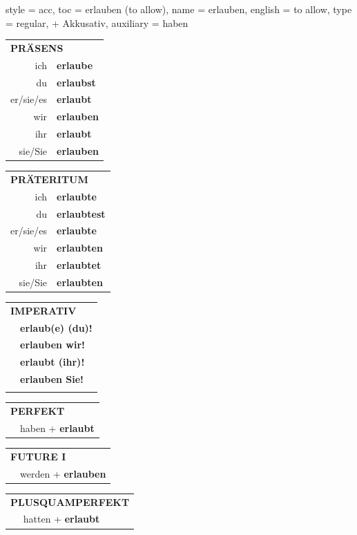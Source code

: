 \begin{verbentry}{
  style = {acc},
  toc = {erlauben (to allow)},
  name = {erlauben},
  english = {to allow},
  type = {regular, + Akkusativ},
  auxiliary = {haben}
}
  \begin{tabular}{rl}
     \multicolumn{2}{l}{\textbf{PRÄSENS} }\\
    ich & \textbf{erlaube}\\
    du & \textbf{erlaubst}\\
    er/sie/es & \textbf{erlaubt}\\
    wir & \textbf{erlauben}\\
    ihr & \textbf{erlaubt}\\
    sie/Sie & \textbf{erlauben}\\
  \end{tabular}
  \hfill
     \begin{tabular}{rl}
    \multicolumn{2}{l}{\textbf{PRÄTERITUM} }\\
    ich & \textbf{erlaubte}\\
    du & \textbf{erlaubtest}\\
    er/sie/es & \textbf{erlaubte}\\
    wir & \textbf{erlaubten}\\
    ihr & \textbf{erlaubtet}\\
    sie/Sie & \textbf{erlaubten}\\
  \end{tabular}
  \hfill
  \begin{tabular}{rl}
     \multicolumn{2}{l}{\textbf{IMPERATIV} }\\
   & \textbf{erlaub(e) (du)!}\\
   & \textbf{erlauben wir!}\\
   & \textbf{erlaubt (ihr)!}\\
   & \textbf{erlauben Sie!}\\
   & \vspace{10pt}
  \end{tabular}

    \vspace{10pt}

 \begin{tabular}{rl}
     \multicolumn{2}{l}{\textbf{PERFEKT}}\\
   & haben + \textbf{erlaubt}\\
  \end{tabular}
\hfill
   \begin{tabular}{rl}
   
    \multicolumn{2}{l}{\textbf{FUTURE I} }\\
  &  werden + \textbf{erlauben}\\
 
  \end{tabular}
\hfill
   \begin{tabular}{rl}
      \multicolumn{2}{l}{\textbf{PLUSQUAMPERFEKT}}\\
  &  hatten + \textbf{erlaubt}\\
  \end{tabular}
  

\end{verbentry}
